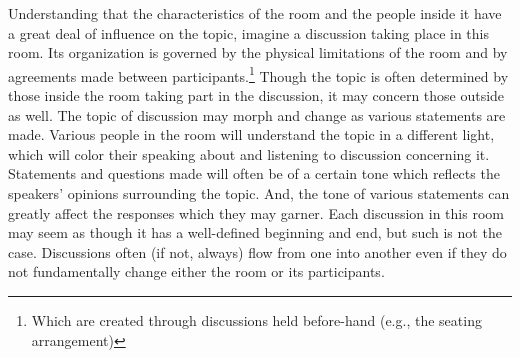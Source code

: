\documentclass[openany,twoside]{memoir}
\begin{document}
\begin{Spacing}{2}
Understanding that the characteristics of the room and the people inside it have a great deal of influence on the topic, imagine a discussion taking place in this room.
Its organization is governed by the physical limitations of the room and by agreements made between participants.\footnote{
Which are created through discussions held before-hand (e.g., the seating arrangement)}
Though the topic is often determined by those inside the room taking part in the discussion, it may concern those outside as well.
The topic of discussion may morph and change as various statements are made.
Various people in the room will understand the topic in a different light, which will color their speaking about and listening to discussion concerning it.
Statements and questions made will often be of a certain tone which reflects the speakers' opinions surrounding the topic.
And, the tone of various statements can greatly affect the responses which they may garner.
Each discussion in this room may seem as though it has a well-defined beginning and end, but such is not the case.
Discussions often (if not, always) flow from one into another even if they do not fundamentally change either the room or its participants.


\end{Spacing}
\end{document}
